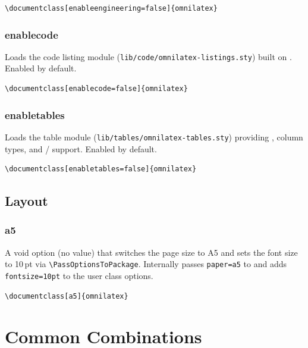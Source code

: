 \begin{verbatim}
\documentclass[enableengineering=false]{omnilatex}
\end{verbatim}

\subsubsection{\textsf{enablecode}}

Loads the code listing module
(\texttt{lib/code/omnilatex-listings.sty}) built on
.  Enabled by default.

\begin{verbatim}
\documentclass[enablecode=false]{omnilatex}
\end{verbatim}

\subsubsection{\textsf{enabletables}}

Loads the table module
(\texttt{lib/tables/omnilatex-tables.sty}) providing
,  column types, and
/ support.  Enabled by
default.

\begin{verbatim}
\documentclass[enabletables=false]{omnilatex}
\end{verbatim}

\subsection{Layout}

\subsubsection{\textsf{a5}}

A void option (no value) that switches the page size to A5 and sets the
font size to 10\,pt via \texttt{\textbackslash PassOptionsToPackage}.
Internally passes \texttt{paper=a5} to  and adds
\texttt{fontsize=10pt} to the user class options.

\begin{verbatim}
\documentclass[a5]{omnilatex}
\end{verbatim}

\section{Common Combinations}


